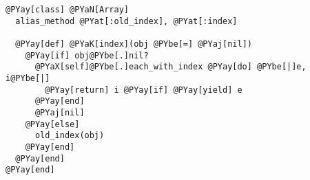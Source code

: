 \begin{Verbatim}[commandchars=@\[\]]
@PYay[class] @PYaN[Array]
  alias_method @PYat[:old_index], @PYat[:index]

  @PYay[def] @PYaK[index](obj @PYbe[=] @PYaj[nil])
    @PYay[if] obj@PYbe[.]nil?
      @PYaX[self]@PYbe[.]each_with_index @PYay[do] @PYbe[|]e, i@PYbe[|]
        @PYay[return] i @PYay[if] @PYay[yield] e
      @PYay[end]
      @PYaj[nil]
    @PYay[else]
      old_index(obj)
    @PYay[end]
  @PYay[end]
@PYay[end]
\end{Verbatim}
